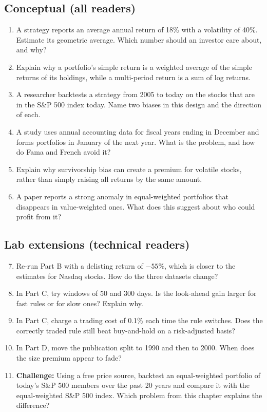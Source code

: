 \subsection*{Conceptual (all readers)}

\begin{enumerate}
  \item A strategy reports an average annual return of 18\% with a volatility of 40\%. Estimate its geometric average. Which number should an investor care about, and why?
  \item Explain why a portfolio's simple return is a weighted average of the simple returns of its holdings, while a multi-period return is a sum of log returns.
  \item A researcher backtests a strategy from 2005 to today on the stocks that are in the S\&P 500 index today. Name two biases in this design and the direction of each.
  \item A study uses annual accounting data for fiscal years ending in December and forms portfolios in January of the next year. What is the problem, and how do Fama and French avoid it?
  \item Explain why survivorship bias can create a premium for volatile stocks, rather than simply raising all returns by the same amount.
  \item A paper reports a strong anomaly in equal-weighted portfolios that disappears in value-weighted ones. What does this suggest about who could profit from it?
\end{enumerate}

\subsection*{Lab extensions (technical readers)}

\begin{enumerate}
  \setcounter{enumi}{6}
  \item Re-run Part B with a delisting return of $-55$\%, which is closer to the estimates for Nasdaq stocks. How do the three datasets change?
  \item In Part C, try windows of 50 and 300 days. Is the look-ahead gain larger for fast rules or for slow ones? Explain why.
  \item In Part C, charge a trading cost of 0.1\% each time the rule switches. Does the correctly traded rule still beat buy-and-hold on a risk-adjusted basis?
  \item In Part D, move the publication split to 1990 and then to 2000. When does the size premium appear to fade?
  \item \textbf{Challenge:} Using a free price source, backtest an equal-weighted portfolio of today's S\&P 500 members over the past 20 years and compare it with the equal-weighted S\&P 500 index. Which problem from this chapter explains the difference?
\end{enumerate}
